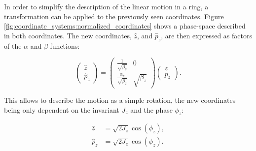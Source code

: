 \subsubsection{}

In order to simplify the description of the linear motion in a ring, a transformation can be applied
to the previously seen coordinates. Figure \cref{fig:coordinate_systems:normalized_coordinates}
shows a phase-space described in both coordinates. The new coordinates, $\hat{z}$, and $\hat{p}_z$,
are then expressed as factors of the $\alpha$ and $\beta$ functions:

\begin{equation}
    \begin{pmatrix}
        \hat{z}    \\
        \hat{p}_z 
    \end{pmatrix}
    =
    \begin{pmatrix}
        \frac{1}{\sqrt{\beta_z}}         &   0 \\
        \frac{\alpha_z}{\sqrt{\beta_z}}  &   \sqrt{\beta_z}
    \end{pmatrix}
    \begin{pmatrix}
        z \\
        p_z 
    \end{pmatrix}.
\end{equation}

This allows to describe the motion as a simple rotation, the new coordinates being only dependent on
the invariant $J_z$ and the phase $\phi_z$:

\begin{equation}
    \begin{aligned}
        \hat{z}   &= \sqrt{2J_z} \cos \left(\phi_z \right), \\
        \hat{p}_z &= \sqrt{2J_z} \cos \left(\phi_z \right).
    \end{aligned}
\end{equation}     

